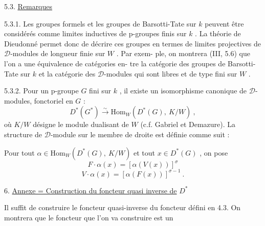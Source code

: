 
5.3. \uline{Remarques}

5.3.1. Les groupes formels et les groupes de Barsotti-Tate sur $k$
peuvent être considérés comme limites inductives de p-groupes finis sur
$k$ . La théorie de Dieudonné permet donc de décrire ces groupes en termes
de limites projectives de $\mathcal{D}$-modules de longueur finie sur $W$ . Par exem-%
ple, on montrera (III, 5.6) que l'on a une équivalence de catégories en-%
tre la catégorie des groupes de Barsotti-Tate sur $k$ et la catégorie
des $\mathcal{D}$-modules qui sont libres et de type fini sur $W$ .

5.3.2. Pour un p-groupe $G$ fini sur $k$ , il existe un isomorphisme
canonique de $\mathcal{D}$-modules, fonctoriel en $G$ :
\[ D^*(G^*) \overset{\sim}{\to} \mathrm{Hom}_W(D^*(G),\ K/W) \ , \]
où $K/W$ désigne le module dualisant de $W$ (c.f. Gabriel et Demazure).
La structure de $\mathcal{D}$-module sur le membre de droite est définie comme suit :

Pour tout $\alpha \in \mathrm{Hom}_W(D^*(G),\ K/W)$ et tout $x \in D^*(G)$ , on pose
\[ F{\cdot}\alpha(x) = [\alpha(V(x))]^{\sigma} \]
\[ V{\cdot}\alpha(x) = [\alpha(F(x))]^{\sigma-1} \ . \]

6. \uline{Annexe = Construction du foncteur quasi inverse de} $D^*$

Il suffit de construire le foncteur quasi-inverse du foncteur
défini en 4.3. On montrera que le foncteur que l'on va construire est un

